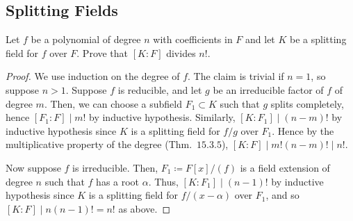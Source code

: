 \documentclass[12pt]{article}
\theoremstyle{remark}
\begin{document}
\subsection{Splitting Fields}
\begin{problem}
  Let $f$ be a polynomial of degree $n$ with coefficients in $F$ and let $K$ be a splitting field for $f$ over $F$.  Prove that $[K:F]$ divides $n!$.
\end{problem}
\begin{proof}
  We use induction on the degree of $f$. The claim is trivial if $n=1$, so suppose $n>1$. Suppose $f$ is reducible, and let $g$ be an irreducible factor of $f$ of degree $m$. Then, we can choose a subfield $F_1 \subset K$ such that $g$ splits completely, hence $[F_1 : F] \mid m!$ by inductive hypothesis. Similarly, $[K : F_1] \mid (n-m)!$ by inductive hypothesis since $K$ is a splitting field for $f/g$ over $F_1$. Hence by the multiplicative property of the degree (Thm.~$15.3.5$), $[K : F] \mid m!(n-m)! \mid n!$.
  \par Now suppose $f$ is irreducible. Then, $F_1 \coloneqq F[x]/(f)$ is a field extension of degree $n$ such that $f$ has a root $\alpha$. Thus, $[K : F_1] \mid (n-1)!$ by inductive hypothesis since $K$ is a splitting field for $f/(x-\alpha)$ over $F_1$, and so $[K : F] \mid n(n-1)! = n!$ as above.
\end{proof}
\end{document}

